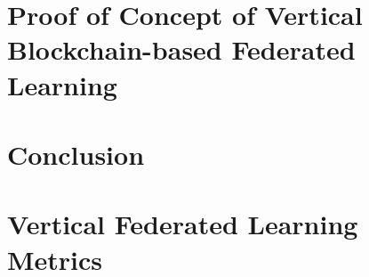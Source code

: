 \documentclass[12pt,a4paper,oneside]{book}
\begin{document}
\chapter{Proof of Concept of Vertical Blockchain-based Federated Learning}\label{chapter:vertical}


\chapter{Conclusion}\label{chapter:conclusion}





\appendix 
{}

\chapter{Vertical Federated Learning Metrics}\label{chapter:vertical_appendix}

\end{document}
